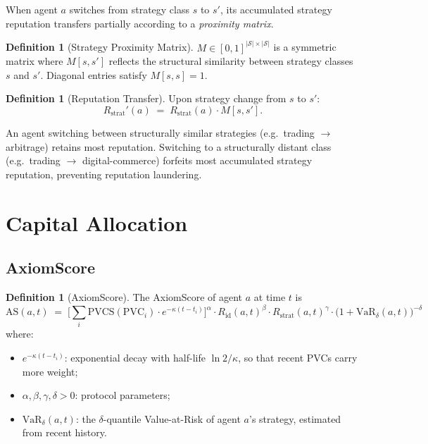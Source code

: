 \documentclass[11pt,a4paper]{article}
\theoremstyle{plain}
\theoremstyle{definition}
\newtheorem{definition}[theorem]{Definition}
\theoremstyle{remark}
\newcommand{\PVC}{\mathrm{PVC}}
\newcommand{\PVCS}{\mathrm{PVCS}}
\newcommand{\AS}{\mathrm{AS}}
\newcommand{\Rid}{R_{\mathrm{id}}}
\newcommand{\Rstrat}{R_{\mathrm{strat}}}
\begin{document}
When agent $a$ switches from strategy class $s$ to $s'$, its accumulated
strategy reputation transfers partially according to a \emph{proximity matrix}.

\begin{definition}[Strategy Proximity Matrix]
$M \in [0,1]^{|\mathcal{S}| \times |\mathcal{S}|}$ is a symmetric matrix where
$M[s, s']$ reflects the structural similarity between strategy classes $s$ and
$s'$. Diagonal entries satisfy $M[s,s] = 1$.
\end{definition}

\begin{definition}[Reputation Transfer]
Upon strategy change from $s$ to $s'$:
\[
  \Rstrat'(a) \;=\; \Rstrat(a) \cdot M[s, s'].
\]
\end{definition}

An agent switching between structurally similar strategies (e.g.\ trading
$\to$ arbitrage) retains most reputation. Switching to a structurally distant
class (e.g.\ trading $\to$ digital-commerce) forfeits most accumulated strategy
reputation, preventing reputation laundering.

\section{Capital Allocation}

\subsection{AxiomScore}

\begin{definition}[AxiomScore]
\label{def:axiom-score}
The AxiomScore of agent $a$ at time $t$ is
\[
  \AS(a, t)
  \;=\;
  \Biggl[\sum_{i} \PVCS(\PVC_i) \cdot e^{-\kappa(t - t_i)}\Biggr]^{\!\alpha}
  \cdot
  \Rid(a, t)^{\beta}
  \cdot
  \Rstrat(a, t)^{\gamma}
  \cdot
  \bigl(1 + \mathrm{VaR}_{\delta}(a, t)\bigr)^{-\delta}
\]
where:
\begin{itemize}
  \item $e^{-\kappa(t - t_i)}$: exponential decay with half-life $\ln 2 / \kappa$,
        so that recent PVCs carry more weight;
  \item $\alpha, \beta, \gamma, \delta > 0$: protocol parameters;
  \item $\mathrm{VaR}_{\delta}(a,t)$: the $\delta$-quantile Value-at-Risk of
        agent $a$'s strategy, estimated from recent history.
\end{itemize}
\end{definition}
\end{document}
